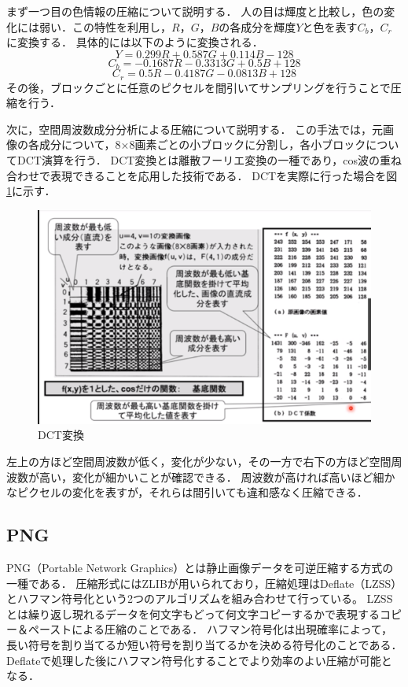 \documentclass[a4paper,11pt]{bxjsarticle}
\begin{document}
まず一つ目の色情報の圧縮について説明する．
人の目は輝度と比較し，色の変化には弱い．この特性を利用し，$R$，$G$，$B$の各成分を輝度$Y$と色を表す$C_b$，$C_r$に変換する．
具体的には以下のように変換される．\cite{jpeg2}
\begin{equation}
  Y = 0.299R + 0.587G + 0.114B - 128
\end{equation}
\begin{equation}
  C_b = - 0.1687R - 0.3313G + 0.5B + 128
\end{equation}
\begin{equation}
  C_r = 0.5R - 0.4187G - 0.0813B + 128
\end{equation}
その後，ブロックごとに任意のピクセルを間引いてサンプリングを行うことで圧縮を行う．

次に，空間周波数成分分析による圧縮について説明する．
この手法では，元画像の各成分について，8×8画素ごとの小ブロックに分割し，各小ブロックについてDCT演算を行う．
DCT変換とは離散フーリエ変換の一種であり，cos波の重ね合わせで表現できることを応用した技術である．
DCTを実際に行った場合を図\ref{fig:dct}に示す．\cite{jpeg1}

\begin{figure}[htbp]
  \centering  %
  \includegraphics[clip,width = 12.0cm]{dct_con.eps}
  \caption{DCT変換}
  \label{fig:dct}
  \end{figure}

左上の方ほど空間周波数が低く，変化が少ない，その一方で右下の方ほど空間周波数が高い，変化が細かいことが確認できる．
周波数が高ければ高いほど細かなピクセルの変化を表すが，それらは間引いても違和感なく圧縮できる．



\subsection{PNG}
PNG（Portable Network Graphics）とは静止画像データを可逆圧縮する方式の一種である．
圧縮形式にはZLIBが用いられており，圧縮処理はDeflate（LZSS）とハフマン符号化という2つのアルゴリズムを組み合わせて行っている。
LZSSとは繰り返し現れるデータを何文字もどって何文字コピーするかで表現するコピー＆ペーストによる圧縮のことである．
ハフマン符号化は出現確率によって，長い符号を割り当てるか短い符号を割り当てるかを決める符号化のことである．
Deflateで処理した後にハフマン符号化することでより効率のよい圧縮が可能となる．\cite{png1}
\end{document}
